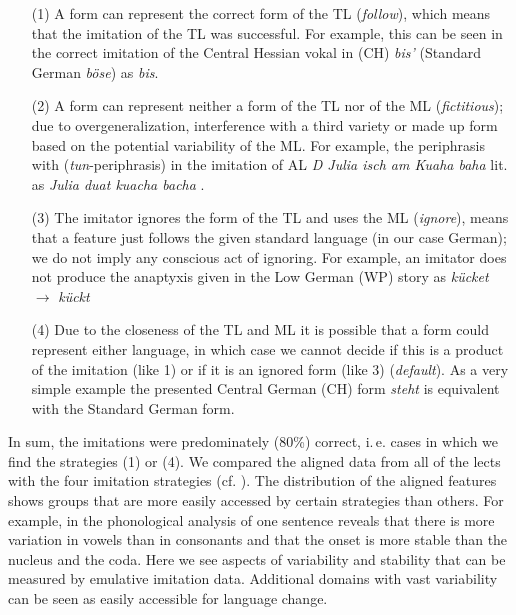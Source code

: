 \documentclass[output=paper]{LSP/langsci}
\begin{document}
\begin{itemize}
\item [(1)] A form can represent the correct form of the TL (\textit{follow}), which means that the imitation of the TL was successful.
 For example, this can be seen in the correct imitation of the Central Hessian vokal in (CH) \textit{bis’} (Standard German \textit{b\"ose})  as \textit{bis}.
 \item [(2)]  A form can represent neither a form of the TL nor of the ML (\textit{fictitious}); due to overgeneralization, interference with a third variety or made up form based on the potential variability of the ML. 
 For example, the periphrasis with  (\textit{tun}-periphrasis) in the imitation of AL \textit{D Julia isch am Kuaha baha} lit.  as \textit{Julia duat kuacha bacha} . 
  \item [(3)] The imitator ignores the form of the TL and uses the ML (\textit{ignore}), means that a feature just follows the given standard language (in our case German); we do not imply any conscious act of ignoring.
  For example, an imitator does not produce the anaptyxis given in the Low German (WP) story as \textit{k\"ucket} $\to$ \textit{k\"uckt}
   \item [(4)] Due to the closeness of the TL and ML it is possible that a form could represent either language, in which case we cannot decide if this is a product of the imitation (like 1) or if it is an ignored form (like 3) (\textit{default}). As a very simple example the presented Central German (CH) form \textit{steht}  is equivalent with the Standard German form.
 \end{itemize}
  
In sum, the imitations were predominately (80\%) correct, i.\,e. cases in which we find the strategies (1) or (4). We compared the aligned data from all of the lects with the four imitation strategies (cf. ). The distribution of the aligned features shows groups that are more easily accessed by certain strategies than others. For example, in  the phonological analysis of one sentence reveals that there is more variation in vowels than in consonants and that the onset is more stable than the nucleus and the coda. Here we see aspects of variability and stability that can be measured by emulative imitation data. Additional domains with vast variability can be seen as easily accessible for language change.
\end{document}
